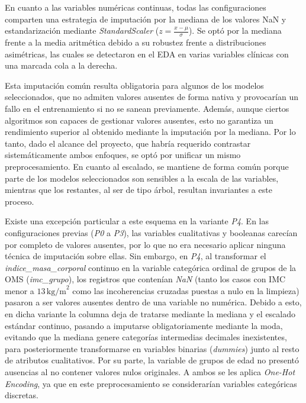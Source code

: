 \documentclass[journal,onecolumn]{IEEEtran}
\begin{document}
En cuanto a las variables numéricas continuas, todas las configuraciones comparten una estrategia de imputación por la mediana de los valores NaN y estandarización mediante \textit{StandardScaler} ($z = \frac{x - \mu}{\sigma}$). Se optó por la mediana frente a la media aritmética debido a su robustez frente a distribuciones asimétricas, las cuales se detectaron en el EDA en varias variables clínicas con una marcada cola a la derecha.

Esta imputación común resulta obligatoria para algunos de los modelos seleccionados, que no admiten valores ausentes de forma nativa y provocarían un fallo en el entrenamiento si no se sanean previamente. Además, aunque ciertos algoritmos son capaces de gestionar valores ausentes, esto no garantiza un rendimiento superior al obtenido mediante la imputación por la mediana. Por lo tanto, dado el alcance del proyecto, que habría requerido contrastar sistemáticamente ambos enfoques, se optó por unificar un mismo preprocesamiento. En cuanto al escalado, se mantiene de forma común porque parte de los modelos seleccionados son sensibles a la escala de las variables, mientras que los restantes, al ser de tipo árbol, resultan invariantes a este proceso.

Existe una excepción particular a este esquema en la variante \textit{P4}. En las configuraciones previas (\textit{P0} a \textit{P3}), las variables cualitativas y booleanas carecían por completo de valores ausentes, por lo que no era necesario aplicar ninguna técnica de imputación sobre ellas. Sin embargo, en \textit{P4}, al transformar el \textit{indice\_masa\_corporal} continuo en la variable categórica ordinal de grupos de la OMS (\textit{imc\_grupo}), los registros que contenían \textit{NaN} (tanto los casos con IMC menor a $13\,\text{kg/m}^2$ como las incoherencias cruzadas puestas a nulo en la limpieza) pasaron a ser valores ausentes dentro de una variable no numérica. Debido a esto, en dicha variante la columna deja de tratarse mediante la mediana y el escalado estándar continuo, pasando a imputarse obligatoriamente mediante la moda, evitando que la mediana genere categorías intermedias decimales inexistentes, para posteriormente transformarse en variables binarias (\textit{dummies}) junto al resto de atributos cualitativos. Por su parte, la variable de grupos de edad no presentó ausencias al no contener valores nulos originales. A ambos se les aplica \textit{One-Hot Encoding}, ya que en este preprocesamiento se considerarían variables categóricas discretas.
\end{document}
